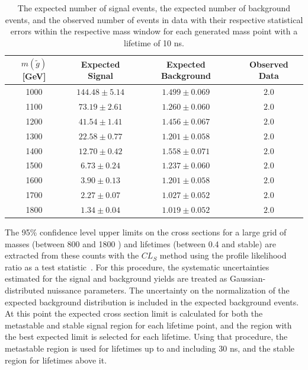 \begin{table}[!htbp]
  \begin{center}
    \begin{tabular}{cccc}
      \hline
      $m(\tilde{g})$ [GeV]  & Expected Signal & Expected Background & Observed Data\\ 
      \hline
      1000    & $144.48 \pm 5.14 $ & $1.499 \pm 0.069 $ & $2.0$ \\
      1100    & $73.19 \pm 2.61 $  & $1.260 \pm 0.060 $ & $2.0$ \\
      1200    & $41.54 \pm 1.41 $  & $1.456 \pm 0.067 $ & $2.0$ \\
      1300    & $22.58 \pm 0.77 $  & $1.201 \pm 0.058 $ & $2.0$ \\
      1400    & $12.70 \pm 0.42 $  & $1.558 \pm 0.071 $ & $2.0$ \\
      1500    & $6.73 \pm 0.24 $   & $1.237 \pm 0.060 $ & $2.0$ \\
      1600    & $3.90 \pm 0.13 $   & $1.201 \pm 0.058 $ & $2.0$ \\
      1700    & $2.27 \pm 0.07 $   & $1.027 \pm 0.052 $ & $2.0$ \\
      1800    & $1.34 \pm 0.04 $   & $1.019 \pm 0.052 $ & $2.0$ \\
      \hline
    \end{tabular}
  \end{center}
  \caption{The expected number of signal events, the expected number of background events, and the observed number of events in data with their respective statistical errors within the respective mass window for each generated mass point with a lifetime of 10 ns.}
  \label{tab:counts_10ns}
\end{table}


The 95\% confidence level upper limits on the cross sections for a large grid of masses (between 800 and 1800 \GeV) and lifetimes (between 0.4 and stable) are extracted from these counts with the $CL_{S}$ method using the profile likelihood ratio as a test statistic~\cite{CLS_method}.
For this procedure, the systematic uncertainties estimated for the signal and background yields are treated as Gaussian-distributed nuissance parameters.
The uncertainty on the normalization of the expected background distribution is included in the expected background events.
At this point the expected cross section limit is calculated for both the metastable and stable signal region for each lifetime point, and the region with the best expected limit is selected for each lifetime.
Using that procedure, the metastable region is used for lifetimes up to and including 30 ns, and the stable region for lifetimes above it. 


